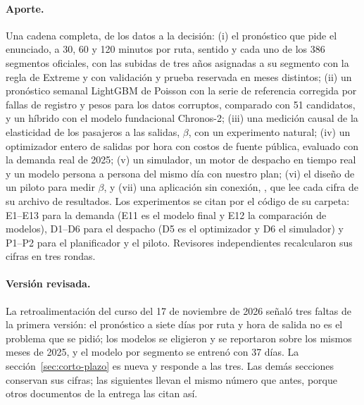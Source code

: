\paragraph{Aporte.} Una cadena completa, de los datos a la decisión: (i) el pronóstico que pide el enunciado, a 30,
60 y 120 minutos por ruta, sentido y cada uno de los 386 segmentos oficiales, con las subidas de tres años asignadas
a su segmento con la regla de Extreme y con validación y prueba reservada en meses distintos; (ii) un pronóstico
semanal LightGBM de Poisson con la
serie de referencia corregida por fallas de registro y pesos para los datos corruptos, comparado con 51
candidatos, y un híbrido con el modelo fundacional Chronos-2; (iii) una medición causal de la elasticidad de los
pasajeros a las salidas, $\beta$, con un experimento natural; (iv) un optimizador entero de salidas por hora con
costos de fuente pública, evaluado con la demanda real de 2025; (v) un simulador, un motor de despacho en tiempo
real y un modelo persona a persona del mismo día con nuestro plan; (vi) el diseño de un piloto para medir $\beta$, y
(vii) una aplicación sin conexión, , que lee cada cifra de su archivo de resultados. Los
experimentos se citan por el código de su carpeta: E1--E13 para la demanda (E11 es el modelo final y E12 la
comparación de modelos), D1--D6 para el despacho (D5 es el optimizador y D6 el simulador) y P1--P2 para el
planificador y el piloto. Revisores independientes recalcularon sus cifras en tres rondas.

\paragraph{Versión revisada.} La retroalimentación del curso del 17 de noviembre de 2026 señaló tres faltas de la
primera versión: el pronóstico a siete días por ruta y hora de salida no es el problema que se pidió; los modelos se
eligieron y se reportaron sobre los mismos meses de 2025, y el modelo por segmento se entrenó con 37 días. La
sección~\ref{sec:corto-plazo} es nueva y responde a las tres. Las demás secciones conservan sus cifras; las
siguientes llevan el mismo número que antes, porque otros documentos de la entrega las citan así.
